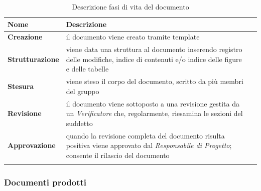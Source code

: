 {
	\setlength{\freewidth}{\dimexpr\textwidth-1\tabcolsep}
	\renewcommand{\arraystretch}{1.5}
	\setlength{\aboverulesep}{0pt}
	\setlength{\belowrulesep}{0pt}
	\begin{longtable}{L{.210\freewidth} L{.6\freewidth} L{.080\freewidth}}
		\toprule 
		\textbf{Nome} & \textbf{Descrizione} & \\
		\toprule
		\endhead		
		\textbf{Creazione} & il documento viene creato tramite template \\ 
		\textbf{Strutturazione} & viene data una struttura al documento inserendo registro delle modifiche, indice di contenuti e/o indice delle figure e delle tabelle\\
		\textbf{Stesura} & viene steso il corpo del documento, scritto da più membri del gruppo \\ 
		\textbf{Revisione} & il documento viene sottoposto a una revisione gestita da un \textit{Verificatore} che, regolarmente, riesamina le sezioni del suddetto \\
		\textbf{Approvazione} & quando la revisione completa del documento risulta positiva viene approvato dal \textit{Responsabile di Progetto}; consente il rilascio del documento \\ 	
				
		\bottomrule
		\hiderowcolors
		\caption{Descrizione fasi di vita del documento}
	\end{longtable}

\subsubsection{Documenti prodotti \hfil}

}
